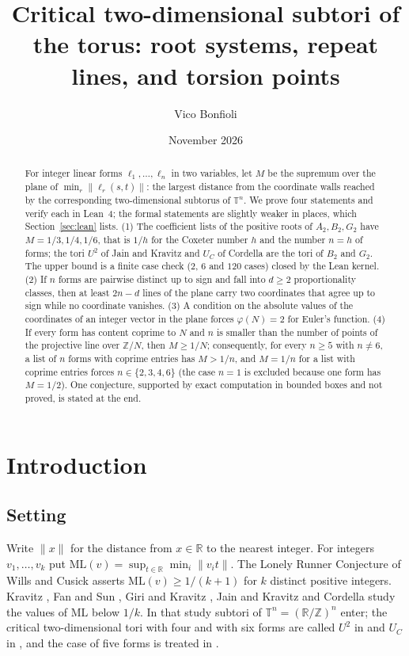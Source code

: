 \documentclass[11pt]{amsart}
\title[Critical two-dimensional subtori]{Critical two-dimensional subtori of the torus: root systems, repeat lines, and torsion points}
\author{Vico Bonfioli}
\date{November 2026}
\theoremstyle{definition}
\theoremstyle{remark}
\newcommand{\R}{\mathbb{R}}
\newcommand{\Z}{\mathbb{Z}}
\newcommand{\T}{\mathbb{T}}
\newcommand{\dist}[1]{\lVert #1\rVert}
\newcommand{\ML}{\mathrm{ML}}
\begin{document}
\begin{abstract}
For integer linear forms $\ell_1,\dots,\ell_n$ in two variables, let $M$ be the supremum over the plane of $\min_r\dist{\ell_r(s,t)}$: the largest distance from the coordinate walls reached by the corresponding two-dimensional subtorus of $\T^n$. We prove four statements and verify each in Lean~4; the formal statements are slightly weaker in places, which Section~\ref{sec:lean} lists. (1) The coefficient lists of the positive roots of $A_2,B_2,G_2$ have $M=1/3,1/4,1/6$, that is $1/h$ for the Coxeter number $h$ and the number $n=h$ of forms; the tori $U^2$ of Jain and Kravitz and $U_C$ of Cordella are the tori of $B_2$ and $G_2$. The upper bound is a finite case check ($2$, $6$ and $120$ cases) closed by the Lean kernel. (2) If $n$ forms are pairwise distinct up to sign and fall into $d\ge2$ proportionality classes, then at least $2n-d$ lines of the plane carry two coordinates that agree up to sign while no coordinate vanishes. (3) A condition on the absolute values of the coordinates of an integer vector in the plane forces $\varphi(N)=2$ for Euler's function. (4) If every form has content coprime to $N$ and $n$ is smaller than the number of points of the projective line over $\Z/N$, then $M\ge1/N$; consequently, for every $n\ge5$ with $n\ne6$, a list of $n$ forms with coprime entries has $M>1/n$, and $M=1/n$ for a list with coprime entries forces $n\in\{2,3,4,6\}$ (the case $n=1$ is excluded because one form has $M=1/2$). One conjecture, supported by exact computation in bounded boxes and not proved, is stated at the end.
\end{abstract}

\maketitle

\section{Introduction}\label{sec:intro}

\subsection{Setting}
Write $\dist{x}$ for the distance from $x\in\R$ to the nearest integer. For integers $v_1,\dots,v_k$ put $\ML(v)=\sup_{t\in\R}\min_i\dist{v_it}$. The Lonely Runner Conjecture of Wills and Cusick \cite{Wills,Cusick} asserts $\ML(v)\ge 1/(k+1)$ for $k$ distinct positive integers. Kravitz \cite{Kravitz}, Fan and Sun \cite{FS}, Giri and Kravitz \cite{GK}, Jain and Kravitz \cite{JK} and Cordella \cite{Cordella} study the values of $\ML$ below $1/k$. In that study subtori of $\T^n=(\R/\Z)^n$ enter; the critical two-dimensional tori with four and with six forms are called $U^2$ in \cite{JK} and $U_C$ in \cite{Cordella}, and the case of five forms is treated in \cite{Cordella,YGB}.
\end{document}
